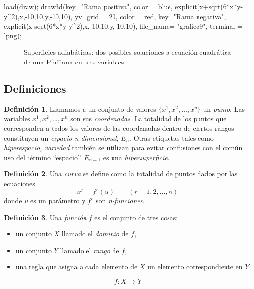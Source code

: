 \documentclass{article}
\theoremstyle{definition} \newtheorem{defi}{Definici\'on}
\theoremstyle{definition} \newtheorem{teo}{Teorema}
\theoremstyle{definition} \newtheorem{cor}{Corolario}
\begin{document}
\begin{maximacmd}
load(draw);
draw3d(key="Rama positiva", color = blue,
	explicit(x+sqrt(6*x*y-y^2),x,-10,10,y,-10,10),
       yv_grid = 20, color   = red, key="Rama negativa",
	explicit(x-sqrt(6*x*y-y^2),x,-10,10,y,-10,10),
	file_name= "grafico9",
	terminal = 'png);
\end{maximacmd}
\begin{figure}
\caption{Superficies adiab\'aticas: dos posibles soluciones a ecuaci\'on cuadr\'atica de una Pfaffiana en tres variables.}
\end{figure}

\subsection{Definiciones}
\begin{defi}
Llamamos a un conjunto de valores $\{x^1, x^2, \dots, x^n\}$ un \emph{punto}. Las variables $x^1, x^2, \dots, x^n$ son sus \emph{coordenadas}. La totalidad de los puntos que corresponden a todos los valores de las coordenadas dentro de ciertos rangos constituyen un \emph{espacio n-dimensional}, $E_n$. 
Otras etiquetas tales como \emph{hiperespacio, variedad} tambi\'en se utilizan para evitar confusiones con el com\'un uso del t\'ermino ``espacio''. $E_{n-1}$ es una \emph{hipersuperficie}.
\end{defi}

\begin{defi}
Una \emph{curva} se define como la totalidad de puntos dados por las ecuaciones
\begin{equation}
x^r=f^r(u) \qquad (r=1,2,\dots,n)
\end{equation}
donde $u$ es un par\'ametro y $f^r$ son \emph{n-funciones.}
\end{defi}

\begin{defi}
Una \emph{funci\'on} $f$ es el conjunto de tres cosas:
\begin{itemize}
\item un conjunto $X$ llamado el \emph{dominio} de $f$,
\item un conjunto $Y$ llamado el \emph{rango} de $f$,
\item una regla que asigna a cada elemento de $X$ un elemento correspondiente en $Y$
\end{itemize}
$$f:X \rightarrow Y$$
\end{defi}
\end{document}
